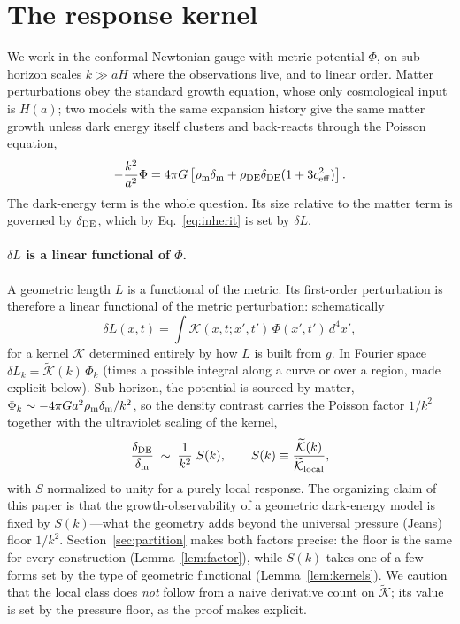\documentclass[twocolumn,10pt]{article}
\newcommand{\dDE}{\delta_{\rm DE}}
\newcommand{\dm}{\delta_{\rm m}}
\begin{document}
\section{The response kernel}
\label{sec:kernel}

We work in the conformal-Newtonian gauge with metric potential $\Phi$, on
sub-horizon scales $k\gg aH$ where the observations live, and to linear order.
Matter perturbations obey the standard growth equation, whose only cosmological
input is $H(a)$; two models with the same expansion history give the same
matter growth unless dark energy itself clusters and back-reacts through the
Poisson equation,
\begin{equation}
-\frac{k^2}{a^2}\Phi=4\pi G\left[\rho_{\rm m}\dm+\rho_{\rm DE}\dDE(1+3c_{\rm eff}^2)\right].
\label{eq:poisson}
\end{equation}
The dark-energy term is the whole question. Its size relative to the matter
term is governed by $\dDE$, which by Eq.~\eqref{eq:inherit} is set by $\delta L$.

\paragraph{$\delta L$ is a linear functional of $\Phi$.}
A geometric length $L$ is a functional of the metric. Its first-order
perturbation is therefore a linear functional of the metric perturbation:
schematically
\begin{equation}
\delta L(x,t)=\int \mathcal{K}(x,t;x',t')\,\Phi(x',t')\,d^4x',
\label{eq:linfunctional}
\end{equation}
for a kernel $\mathcal{K}$ determined entirely by how $L$ is built from $g$.
In Fourier space $\delta L_k=\widetilde{\mathcal{K}}(k)\,\Phi_k$ (times a
possible integral along a curve or over a region, made explicit below).
Sub-horizon, the potential is sourced by matter, $\Phi_k\sim -4\pi G a^2
\rho_{\rm m}\dm/k^2$, so the density contrast carries the Poisson factor
$1/k^2$ together with the ultraviolet scaling of the kernel,
\begin{equation}
\frac{\dDE}{\dm}\;\sim\;\frac{1}{k^{2}}\;S(k),\qquad
S(k)\equiv\frac{\widetilde{\mathcal K}(k)}{\widetilde{\mathcal K}_{\rm local}},
\label{eq:master}
\end{equation}
with $S$ normalized to unity for a purely local response. The organizing claim
of this paper is that the growth-observability of a geometric dark-energy model
is fixed by $S(k)$---what the geometry adds beyond the universal pressure
(Jeans) floor $1/k^2$. Section~\ref{sec:partition} makes both factors precise:
the floor is the same for every construction (Lemma~\ref{lem:factor}), while
$S(k)$ takes one of a few forms set by the type of geometric functional
(Lemma~\ref{lem:kernels}). We caution that the local class does \emph{not}
follow from a naive derivative count on $\widetilde{\mathcal K}$; its value is
set by the pressure floor, as the proof makes explicit.
\end{document}
